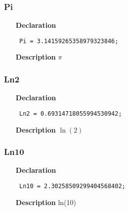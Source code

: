 \documentclass[12pt,a4paper,oneside]{report}
\newcommand{\declarationitem}[1]{\textbf{#1}}
\newcommand{\descriptiontitle}[1]{\textbf{#1}}
\newcommand{\code}[1]{\texttt{#1}}
\begin{document}
\subsubsection{Pi}
\label{utypes-Pi}
\begin{itemize}\item[\declarationitem{Declaration}\hfill]
	\begin{flushleft}
		\code{
			Pi         = 3.14159265358979323846;}
		
	\end{flushleft}
	
	\par
	\item[\descriptiontitle{Description}]
	$\pi$
	
\end{itemize}
\subsubsection{Ln2}
\label{utypes-Ln2}
\begin{itemize}\item[\declarationitem{Declaration}\hfill]
	\begin{flushleft}
		\code{
			Ln2        = 0.69314718055994530942;}
		
	\end{flushleft}
	
	\par
	\item[\descriptiontitle{Description}]
	$\ln(2)$
	
\end{itemize}
\subsubsection{Ln10}
\label{utypes-Ln10}
\begin{itemize}\item[\declarationitem{Declaration}\hfill]
	\begin{flushleft}
		\code{
			Ln10       = 2.30258509299404568402;}
		
	\end{flushleft}
	
	\par
	\item[\descriptiontitle{Description}]
	ln(10)
	
\end{itemize}
\end{document}
